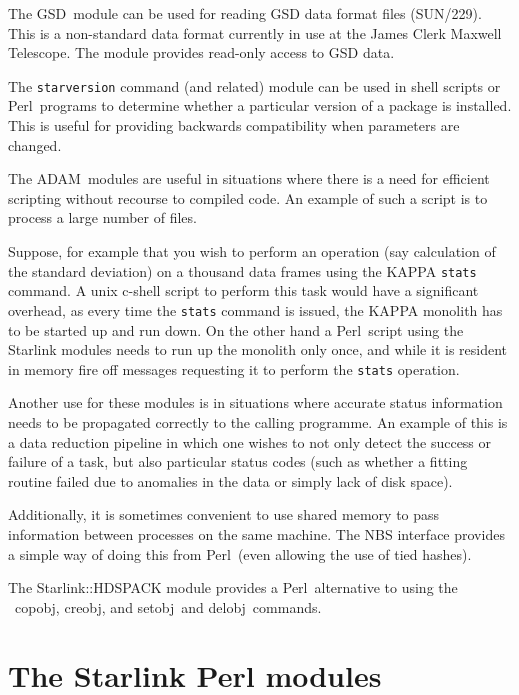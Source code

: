 \documentclass[twoside,11pt]{article}
\newcommand{\task}[1]{{\sf #1}}
\newcommand{\Figaro}{\xref{{\sc{Figaro}}}{sun86}{}}
\newcommand{\ADAM}{\xref{{ADAM}}{sun144}{}}
\newcommand{\gsd}{\xref{{GSD}}{sun229}{}}
\newcommand{\perl}{\xref{\textsf{Perl}}{sun193}{}}
\newcommand{\delobj}{\xref{\task{delobj}}{sun86}{DELOBJ}}
\newcommand{\creobj}{\xref{\task{creobj}}{sun86}{CREOBJ}}
\newcommand{\setobj}{\xref{\task{setobj}}{sun86}{SETOBJ}}
\newcommand{\copobj}{\xref{\task{copobj}}{sun86}{COPOBJ}}
\newcommand{\htmladdnormallink}[2]{#1}
\newcommand{\xref}[3]{#1}
\renewcommand{\_}{\texttt{\symbol{95}}}
\begin{document}
The \gsd\ module can be used for reading GSD data format files (SUN/229). This
is a non-standard data format currently in use at the \htmladdnormallink{James
  Clerk Maxwell Telescope}{http://www.jach.hawaii.edu/JACpublic/JCMT}.  The
module provides read-only access to GSD data.

The \texttt{starversion} command (and related) module can be used in shell
scripts or \perl\ programs to determine whether a particular version of a
package is installed. This is useful for providing backwards compatibility
when parameters are changed.

The \ADAM\  modules are useful in situations where there is a need for
efficient scripting without recourse to compiled code. An example of
such a script is to process a large number of files.

Suppose, for example that you wish to perform an operation (say calculation of
the standard deviation) on a thousand data frames using the
\xref{KAPPA}{sun95}{} \xref{\texttt{stats}}{sun95}{STATS} command. A unix
c-shell script to perform this task would have a significant overhead, as
every time the \texttt{stats} command is issued, the \xref{KAPPA}{sun95}{}
monolith has to be started up and run down. On the other hand a \perl\ script
using the Starlink modules needs to run up the monolith only once, and while
it is resident in memory fire off messages requesting it to perform the
\xref{\texttt{stats}}{sun95}{STATS} operation.

Another use for these modules is in situations where accurate status
information needs to be propagated correctly to the calling
programme. An example of this is a data reduction pipeline in which
one wishes to not only detect the success or failure of a task, but
also particular status codes (such as whether a fitting routine failed
due to anomalies in the data or simply lack of disk space).

Additionally, it is sometimes convenient to use shared memory to pass
information between processes on the same machine. The NBS interface
provides a simple way of doing this from \perl\ (even allowing the use
of tied hashes).

The Starlink::HDSPACK module provides a \perl\ alternative to using the
\Figaro\ \copobj, \creobj, and \setobj\ and \delobj\ commands.

\section{The Starlink Perl modules}
\end{document}
